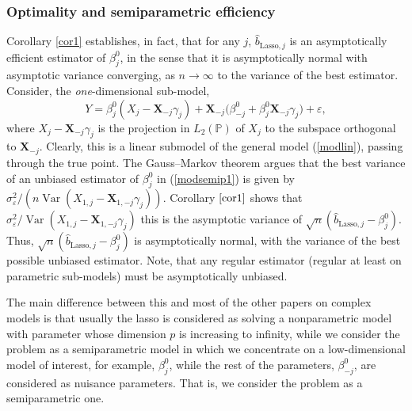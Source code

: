 \documentclass[aos,MSNbibl,dvips]{arximspdf}
\newcommand{\eqref}[1]{(\ref{#1})}
\newcommand{\PP}{\mathbb{P}}
\newcommand{\eps}{\varepsilon}
\newcommand{\Var}{\operatorname{Var}}
\newcommand{\bx}{\mathbf{X}}
\begin{document}
\subsubsection{Optimality and semiparametric efficiency}\label{secasyEff}

$\!\!\!$Corollary \ref{cor1} establishes, in fact, that for any $j$, $\hat
b_{\mathrm{Lasso},j}$ is an asymptotically efficient estimator of
$\beta
^0_j$, in the sense that it is asymptotically normal with asymptotic
variance converging, as $n\to\infty$ to the variance of the best
estimator. Consider, the \emph{one}-dimensional sub-model,
%
\begin{equation}
\label{modsemip1} Y=\beta_j^0(X_j-
\bx_{-j}\gamma_j)+\bx_{-j}\bigl(
\beta^0_{-j}+\beta ^0_j\bx
_{-j}\gamma_j\bigr)+\eps,
\end{equation}
%
where
$X_j-\bx_{-j}\gamma_j$ is the projection in $L_2 (\PP)$ of $X_j$ to
the subspace
orthogonal to $\bx_{-j}$. Clearly, this is a linear submodel of the general
model \eqref{modlin}, passing through the true point. The Gauss--Markov
theorem argues that the best variance of an unbiased estimator of
$\beta_j^0$
in \eqref{modsemip1} is given by $\sigma_\eps^2
/(n \Var(X_{1,j}-\bx_{1, -j}\gamma_j))$. Corollary $\ref{cor1}$
shows that
$\sigma_\eps^2
/ \Var(X_{1,j}-\bx_{1, -j}\gamma_j)$
this is the asymptotic variance of $\sqrt n ( \hat b_{\mathrm
{Lasso},j}- \beta_j^0) $. Thus, $\sqrt n (\hat
b_{\mathrm{Lasso},j}- \beta_j^0)$ is asymptotically normal, with the
variance of the best
possible unbiased estimator. Note, that any regular estimator (regular at
least on parametric sub-models) must be asymptotically unbiased.

The main difference between this and most of the other papers on complex
models is that usually the lasso is considered as solving a nonparametric
model with parameter whose dimension $p$ is increasing to infinity, while
we consider the
problem as a semiparametric model in which we concentrate on a
low-dimensional model of interest, for example, $\beta^0_j$, while the
rest of the
parameters, $\beta^0_{-j}$, are considered as nuisance parameters.
That is,
we consider the problem as a semiparametric one.
\end{document}
